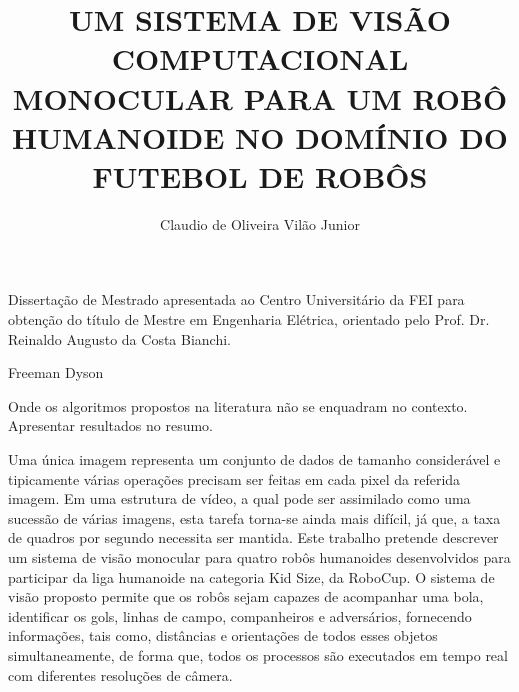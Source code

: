 \documentclass[rascunho]{fei}
\author{Claudio de Oliveira Vilão Junior}
\title{UM SISTEMA DE VISÃO COMPUTACIONAL MONOCULAR PARA UM ROBÔ HUMANOIDE NO DOMÍNIO DO FUTEBOL DE ROBÔS}
\begin{document}
\overfullrule=2cm
\maketitle

\begin{folhaderosto}
Dissertação de Mestrado apresentada ao Centro Universitário da FEI para obtenção do título de Mestre em Engenharia Elétrica, orientado pelo Prof. Dr. Reinaldo Augusto da Costa Bianchi.
\end{folhaderosto}

{}


 {Freeman Dyson}

\begin{resumo}

Onde os algoritmos propostos na literatura não se enquadram no contexto. Apresentar resultados no resumo.


Uma única imagem representa um conjunto de dados de tamanho considerável e tipicamente várias operações precisam ser feitas em cada pixel da referida imagem. Em uma estrutura de vídeo, a qual pode ser assimilado como uma sucessão de várias imagens, esta tarefa torna-se ainda mais difícil, já que, a taxa de quadros por segundo necessita ser mantida. Este trabalho pretende descrever um sistema de visão monocular para quatro robôs humanoides desenvolvidos para participar da liga humanoide na categoria Kid Size, da RoboCup. O sistema de visão proposto permite que os robôs sejam capazes de acompanhar uma bola, identificar os gols, linhas de campo, companheiros e adversários, fornecendo informações, tais como, distâncias e orientações de todos esses objetos simultaneamente, de forma que, todos os processos são executados em tempo real com diferentes resoluções de câmera.


\end{resumo}
\end{document}
